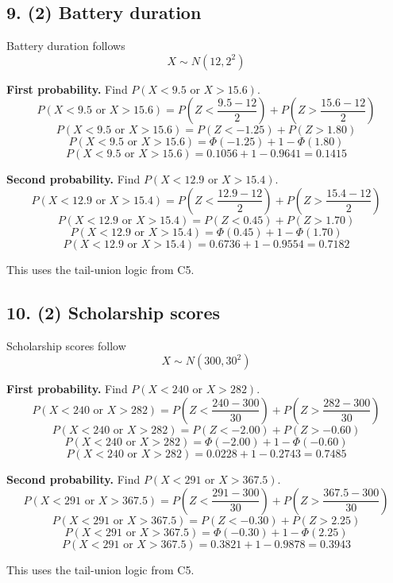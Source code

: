 	\subsection*{9. (2) Battery duration}
	\label{subsec:contextual-normal-distribution-problems-c6-9}
	Battery duration follows
	\[
	X\sim N(12,2^2)
	\]
	
	\textbf{First probability.} Find \(P(X<9.5\text{ or }X>15.6)\).
	\[
	P(X<9.5\text{ or }X>15.6)
	=
	P\left(Z<\frac{9.5-12}{2}\right)
	+
	P\left(Z>\frac{15.6-12}{2}\right)
	\]
	\[
	P(X<9.5\text{ or }X>15.6)=P(Z<-1.25)+P(Z>1.80)
	\]
	\[
	P(X<9.5\text{ or }X>15.6)
	=
	\Phi(-1.25)+1-\Phi(1.80)
	\]
	\[
	P(X<9.5\text{ or }X>15.6)
	=
	0.1056+1-0.9641
	=
	0.1415
	\]
	
	\textbf{Second probability.} Find \(P(X<12.9\text{ or }X>15.4)\).
	\[
	P(X<12.9\text{ or }X>15.4)
	=
	P\left(Z<\frac{12.9-12}{2}\right)
	+
	P\left(Z>\frac{15.4-12}{2}\right)
	\]
	\[
	P(X<12.9\text{ or }X>15.4)=P(Z<0.45)+P(Z>1.70)
	\]
	\[
	P(X<12.9\text{ or }X>15.4)
	=
	\Phi(0.45)+1-\Phi(1.70)
	\]
	\[
	P(X<12.9\text{ or }X>15.4)
	=
	0.6736+1-0.9554
	=
	0.7182
	\]
	
	This uses the tail-union logic from C5.
	
	
	\subsection*{10. (2) Scholarship scores}
	\label{subsec:contextual-normal-distribution-problems-c6-10}
	Scholarship scores follow
	\[
	X\sim N(300,30^2)
	\]
	
	\textbf{First probability.} Find \(P(X<240\text{ or }X>282)\).
	\[
	P(X<240\text{ or }X>282)
	=
	P\left(Z<\frac{240-300}{30}\right)
	+
	P\left(Z>\frac{282-300}{30}\right)
	\]
	\[
	P(X<240\text{ or }X>282)=P(Z<-2.00)+P(Z>-0.60)
	\]
	\[
	P(X<240\text{ or }X>282)
	=
	\Phi(-2.00)+1-\Phi(-0.60)
	\]
	\[
	P(X<240\text{ or }X>282)
	=
	0.0228+1-0.2743
	=
	0.7485
	\]
	
	\textbf{Second probability.} Find \(P(X<291\text{ or }X>367.5)\).
	\[
	P(X<291\text{ or }X>367.5)
	=
	P\left(Z<\frac{291-300}{30}\right)
	+
	P\left(Z>\frac{367.5-300}{30}\right)
	\]
	\[
	P(X<291\text{ or }X>367.5)=P(Z<-0.30)+P(Z>2.25)
	\]
	\[
	P(X<291\text{ or }X>367.5)
	=
	\Phi(-0.30)+1-\Phi(2.25)
	\]
	\[
	P(X<291\text{ or }X>367.5)
	=
	0.3821+1-0.9878
	=
	0.3943
	\]
	
	This uses the tail-union logic from C5.
	
